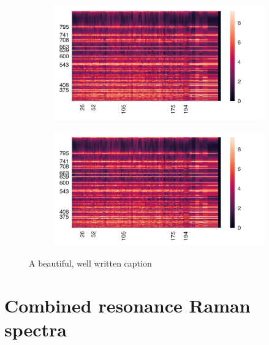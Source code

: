 \documentclass[
	fontsize=10pt, %
	twoside=true, %
	numbers=noenddot, %
]{kaobook}
\begin{document}
\begin{figure}[h]
\begin{subfigure}{8.25cm}\centering\includegraphics{comb-as12}\end{subfigure}%
\begin{subfigure}{8.25cm}\centering\includegraphics{comb-as12}\end{subfigure}
\caption[short]{A beautiful, well written caption}
\end{figure}

\newpage
\section{Combined resonance Raman spectra}


\backmatter %

\end{document}
